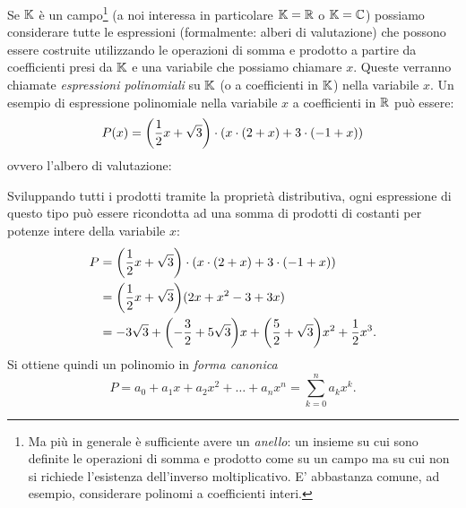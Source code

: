 Se $\mathbb K$ è un campo\footnote{%
Ma più in generale è sufficiente
avere un \emph{anello}: un insieme su cui sono definite le operazioni
di somma e prodotto come su un campo ma su cui non si richiede
l'esistenza dell'inverso moltiplicativo.
E' abbastanza comune, ad esempio, considerare polinomi
a coefficienti interi.}
(a noi interessa in particolare $\mathbb K=\mathbb R$ o $\mathbb K=\mathbb C$)
possiamo considerare tutte le espressioni
(formalmente: alberi di valutazione)
che possono essere costruite utilizzando le operazioni
di somma e prodotto a partire da coefficienti presi da $\mathbb K$
e una variabile che possiamo chiamare $x$.
Queste verranno chiamate \emph{espressioni polinomiali} su $\mathbb K$
(o a coefficienti in $\mathbb K$)
nella variabile $x$. Un esempio di espressione polinomiale
nella variabile $x$ a coefficienti in $\mathbb R$ può essere:
\[
  P(x) = {\left( \frac 1 2 x+\sqrt 3 \right)}\cdot(x\cdot (2+x) + 3\cdot(-1+x))
\]
ovvero l'albero di valutazione:
\begin{center}
\end{center}
Sviluppando tutti i prodotti tramite la proprietà distributiva,
ogni espressione di questo tipo può essere ricondotta ad una
somma di prodotti di costanti per potenze intere della variabile
$x$:
\begin{align*}
P &= {\left( \frac 1 2 x+\sqrt 3 \right)}\cdot(x\cdot (2 + x)
+ 3\cdot(-1+x))\\
&= {\left( \frac 1 2 x + \sqrt 3 \right)} (2x+x^2-3+3x) \\
&= - 3 \sqrt 3 + {\left( -\frac{3}{2}+ 5\sqrt 3 \right)} x
  + {\left( \frac{5}{2}+\sqrt 3 \right)} x^2 + \frac 1 2 x^3.
\end{align*}
Si ottiene quindi un polinomio in \emph{forma canonica}
\[
  P = a_0 + a_1 x + a_2 x^2 + \dots + a_n x^n
       = \sum_{k=0}^n a_k x^k.
\]
